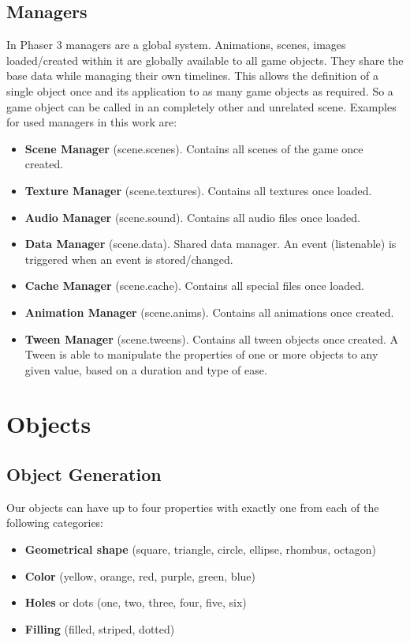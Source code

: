 \subsection{Managers}\label{subsec:managers}
In Phaser 3 managers are a global system.
Animations, scenes, images loaded/created within it are globally available to all game objects.
They share the base data while managing their own timelines.
This allows the definition of a single object once and its application to as many game objects as required.
So a game object can be called in an completely other and unrelated scene\cite{phaser-guides-scenes}.
Examples for used managers in this work are:

\begin{itemize}
    \item \textbf{Scene Manager} (scene.scenes). Contains all scenes of the game once created.
    \item \textbf{Texture Manager} (scene.textures). Contains all textures once loaded.
    \item \textbf{Audio Manager} (scene.sound). Contains all audio files once loaded.
    \item \textbf{Data Manager} (scene.data). Shared data manager.
    An event (listenable) is triggered when an event is stored/changed.
    \item \textbf{Cache Manager} (scene.cache). Contains all special files once loaded.
    \item \textbf{Animation Manager} (scene.anims). Contains all animations once created.
    \item \textbf{Tween Manager} (scene.tweens). Contains all tween objects once created.
    A Tween is able to manipulate the properties of one or more objects to any given value, based
    on a duration and type of ease.
\end{itemize}

\section{Objects}\label{sec:objects}
\subsection{Object Generation}\label{subsec:object-generation}
Our objects can have up to four properties with exactly one from each of the following categories:

\begin{itemize}
    \item \textbf{Geometrical shape} (square, triangle, circle, ellipse, rhombus, octagon)
    \item \textbf{Color} (yellow, orange, red, purple, green, blue)
    \item \textbf{Holes} or dots (one, two, three, four, five, six)
    \item \textbf{Filling} (filled, striped, dotted)
\end{itemize}

